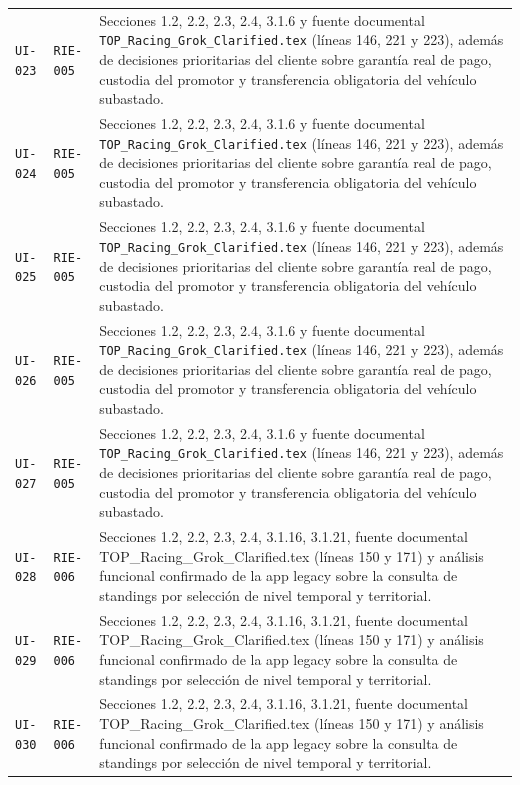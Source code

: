 \documentclass[10pt,letterpaper]{article}
\begin{document}
\begin{landscape}
\begin{longtable}{P{2.7cm}P{2.6cm}P{15.7cm}}
\texttt{UI-023} & \texttt{RIE-005} & Secciones 1.2, 2.2, 2.3, 2.4, 3.1.6 y fuente documental \texttt{TOP\_Racing\_Grok\_Clarified.tex} (líneas 146, 221 y 223), además de decisiones prioritarias del cliente sobre garantía real de pago, custodia del promotor y transferencia obligatoria del vehículo subastado.\\
\texttt{UI-024} & \texttt{RIE-005} & Secciones 1.2, 2.2, 2.3, 2.4, 3.1.6 y fuente documental \texttt{TOP\_Racing\_Grok\_Clarified.tex} (líneas 146, 221 y 223), además de decisiones prioritarias del cliente sobre garantía real de pago, custodia del promotor y transferencia obligatoria del vehículo subastado.\\
\texttt{UI-025} & \texttt{RIE-005} & Secciones 1.2, 2.2, 2.3, 2.4, 3.1.6 y fuente documental \texttt{TOP\_Racing\_Grok\_Clarified.tex} (líneas 146, 221 y 223), además de decisiones prioritarias del cliente sobre garantía real de pago, custodia del promotor y transferencia obligatoria del vehículo subastado.\\
\texttt{UI-026} & \texttt{RIE-005} & Secciones 1.2, 2.2, 2.3, 2.4, 3.1.6 y fuente documental \texttt{TOP\_Racing\_Grok\_Clarified.tex} (líneas 146, 221 y 223), además de decisiones prioritarias del cliente sobre garantía real de pago, custodia del promotor y transferencia obligatoria del vehículo subastado.\\
\texttt{UI-027} & \texttt{RIE-005} & Secciones 1.2, 2.2, 2.3, 2.4, 3.1.6 y fuente documental \texttt{TOP\_Racing\_Grok\_Clarified.tex} (líneas 146, 221 y 223), además de decisiones prioritarias del cliente sobre garantía real de pago, custodia del promotor y transferencia obligatoria del vehículo subastado.\\
\texttt{UI-028} & \texttt{RIE-006} & Secciones 1.2, 2.2, 2.3, 2.4, 3.1.16, 3.1.21, fuente documental TOP\_Racing\_Grok\_Clarified.tex (líneas 150 y 171) y análisis funcional confirmado de la app legacy sobre la consulta de standings por selección de nivel temporal y territorial.\\
\texttt{UI-029} & \texttt{RIE-006} & Secciones 1.2, 2.2, 2.3, 2.4, 3.1.16, 3.1.21, fuente documental TOP\_Racing\_Grok\_Clarified.tex (líneas 150 y 171) y análisis funcional confirmado de la app legacy sobre la consulta de standings por selección de nivel temporal y territorial.\\
\texttt{UI-030} & \texttt{RIE-006} & Secciones 1.2, 2.2, 2.3, 2.4, 3.1.16, 3.1.21, fuente documental TOP\_Racing\_Grok\_Clarified.tex (líneas 150 y 171) y análisis funcional confirmado de la app legacy sobre la consulta de standings por selección de nivel temporal y territorial.\\

\end{longtable}
\end{landscape}
\end{document}
